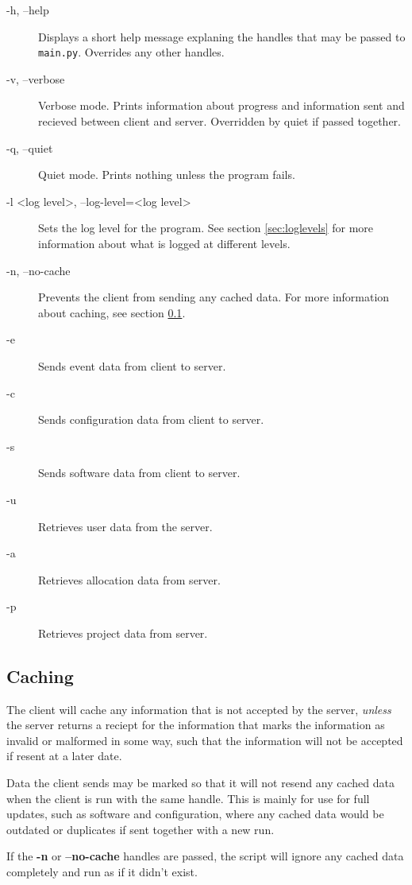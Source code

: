 \documentclass[titlepage, a4paper,10pt]{article}
\begin{document}
\begin{description}
    \item[-h, --help]   Displays a short help message explaning the handles
    that may be passed to \texttt{main.py}. Overrides any other handles.
    \item[-v, --verbose]    Verbose mode. Prints information about progress and
    information sent and recieved between client and server. Overridden by
    quiet if passed together.
    \item[-q, --quiet]  Quiet mode. Prints nothing unless the program fails.
    \item[-l \textless log level\textgreater, --log-level=\textless log
    level\textgreater] Sets the log level for the program. See section 
    \ref{sec:loglevels} for more information about what is logged at different 
    levels.
    \item[-n, --no-cache]   Prevents the client from sending any cached data.
    For more information about caching, see section \ref{sec:caching}.
    \item[-e]   Sends event data from client to server.
    \item[-c]   Sends configuration data from client to server.
    \item[-s]   Sends software data from client to server.
    \item[-u]   Retrieves user data from the server.
    \item[-a]   Retrieves allocation data from server.
    \item[-p]   Retrieves project data from server.
\end{description}

\subsection{Caching}
\label{sec:caching}
The client will cache any information that is not accepted by the server, 
\textit{unless} the server returns a reciept for the information that marks the 
information as invalid or malformed in some way, such that the information will 
not be accepted if resent at a later date. 

Data the client sends may be marked so that it will not resend any cached data
when the client is run with the same handle. This is mainly for use for full
updates, such as software and configuration, where any cached data would be
outdated or duplicates if sent together with a new run.

If the \textbf{-n} or \textbf{--no-cache} handles are passed, the script will
ignore any cached data completely and run as if it didn't exist.
\end{document}
